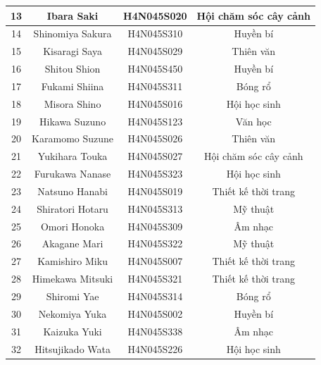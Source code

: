 \documentclass[../main.tex]{subfiles}
\begin{document}
\begin{center}
\begin{tabular}{|c|c|c|c|}
    13           & Ibara Saki          & H4N045S020  & Hội chăm sóc cây cảnh       \\ \hline
    14           & Shinomiya Sakura    & H4N045S310  & Huyền bí                    \\ \hline
    15           & Kisaragi Saya       & H4N045S029  & Thiên văn                   \\ \hline
    16           & Shitou Shion        & H4N045S450  & Huyền bí                    \\ \hline
    17           & Fukami Shiina       & H4N045S311  & Bóng rổ                     \\ \hline
    18           & Misora Shino        & H4N045S016  & Hội học sinh                \\ \hline
    19           & Hikawa Suzuno       & H4N045S123  & Văn học                     \\ \hline
    20           & Karamomo Suzune     & H4N045S026  & Thiên văn                   \\ \hline
    21           & Yukihara Touka      & H4N045S027  & Hội chăm sóc cây cảnh       \\ \hline
    22           & Furukawa Nanase     & H4N045S323  & Hội học sinh                \\ \hline
    23           & Natsuno Hanabi      & H4N045S019  & Thiết kế thời trang         \\ \hline
    24           & Shiratori Hotaru    & H4N045S313  & Mỹ thuật                    \\ \hline
    25           & Omori Honoka        & H4N045S309  & Âm nhạc                     \\ \hline
    26           & Akagane Mari        & H4N045S322  & Mỹ thuật                    \\ \hline
    27           & Kamishiro Miku      & H4N045S007  & Thiết kế thời trang         \\ \hline
    28           & Himekawa Mitsuki    & H4N045S321  & Thiết kế thời trang         \\ \hline
    29           & Shiromi Yae         & H4N045S314  & Bóng rổ                     \\ \hline
    30           & Nekomiya Yuka       & H4N045S002  & Huyền bí                    \\ \hline
    31           & Kaizuka Yuki        & H4N045S338  & Âm nhạc                     \\ \hline
    32           & Hitsujikado Wata    & H4N045S226  & Hội học sinh                \\ \hline
  \end{tabular}
\end{center}
\end{document}
